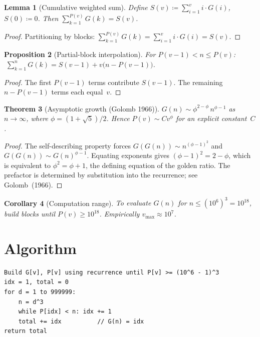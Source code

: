 \documentclass[a4paper,12pt]{article}
\newtheorem{theorem}{Theorem}
\newtheorem{lemma}[theorem]{Lemma}
\newtheorem{proposition}[theorem]{Proposition}
\newtheorem{corollary}[theorem]{Corollary}
\begin{document}
\begin{lemma}[Cumulative weighted sum]
Define $S(v) \coloneqq \sum_{i=1}^{v} i \cdot G(i)$, $S(0) \coloneqq 0$. Then $\sum_{k=1}^{P(v)} G(k) = S(v)$.
\end{lemma}

\begin{proof}
Partitioning by blocks: $\sum_{k=1}^{P(v)} G(k) = \sum_{i=1}^{v} i \cdot G(i) = S(v)$.
\end{proof}

\begin{proposition}[Partial-block interpolation]
For $P(v-1) < n \le P(v)$: $\;\sum_{k=1}^{n} G(k) = S(v-1) + v\bigl(n - P(v-1)\bigr)$.
\end{proposition}

\begin{proof}
The first $P(v-1)$ terms contribute $S(v-1)$. The remaining $n - P(v-1)$ terms each equal~$v$.
\end{proof}

\begin{theorem}[Asymptotic growth (Golomb 1966)]
$G(n) \sim \phi^{2-\phi}\, n^{\phi - 1}$ as $n \to \infty$, where $\phi = (1+\sqrt{5})/2$. Hence $P(v) \sim C v^{\phi}$ for an explicit constant~$C$.
\end{theorem}

\begin{proof}
The self-describing property forces $G(G(n)) \sim n^{(\phi-1)^2}$ and $G(G(n)) \sim G(n)^{\phi-1}$. Equating exponents gives $(\phi-1)^2 = 2 - \phi$, which is equivalent to $\phi^2 = \phi + 1$, the defining equation of the golden ratio. The prefactor is determined by substitution into the recurrence; see Golomb~(1966).
\end{proof}

\begin{corollary}[Computation range]
To evaluate $G(n)$ for $n \le (10^6)^3 = 10^{18}$, build blocks until $P(v) \ge 10^{18}$. Empirically $v_{\max} \approx 10^7$.
\end{corollary}

\section{Algorithm}

\begin{verbatim}
Build G[v], P[v] using recurrence until P[v] >= (10^6 - 1)^3
idx = 1, total = 0
for d = 1 to 999999:
    n = d^3
    while P[idx] < n: idx += 1
    total += idx          // G(n) = idx
return total
\end{verbatim}
\end{document}
